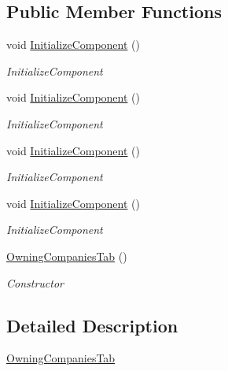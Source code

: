 \subsection*{Public Member Functions}
\begin{DoxyCompactItemize}
\item 
void \hyperlink{class_baudi_1_1_client_1_1_view_1_1_tabs_1_1_owning_companies_tab_a6af8326189b6a8d1e625456e1c353631}{Initialize\+Component} ()
\begin{DoxyCompactList}\small\item\em Initialize\+Component \end{DoxyCompactList}\item 
void \hyperlink{class_baudi_1_1_client_1_1_view_1_1_tabs_1_1_owning_companies_tab_a6af8326189b6a8d1e625456e1c353631}{Initialize\+Component} ()
\begin{DoxyCompactList}\small\item\em Initialize\+Component \end{DoxyCompactList}\item 
void \hyperlink{class_baudi_1_1_client_1_1_view_1_1_tabs_1_1_owning_companies_tab_a6af8326189b6a8d1e625456e1c353631}{Initialize\+Component} ()
\begin{DoxyCompactList}\small\item\em Initialize\+Component \end{DoxyCompactList}\item 
void \hyperlink{class_baudi_1_1_client_1_1_view_1_1_tabs_1_1_owning_companies_tab_a6af8326189b6a8d1e625456e1c353631}{Initialize\+Component} ()
\begin{DoxyCompactList}\small\item\em Initialize\+Component \end{DoxyCompactList}\item 
\hyperlink{class_baudi_1_1_client_1_1_view_1_1_tabs_1_1_owning_companies_tab_af3364319af72ee75b95ff3c95cc388fa}{Owning\+Companies\+Tab} ()
\begin{DoxyCompactList}\small\item\em Constructor \end{DoxyCompactList}\end{DoxyCompactItemize}


\subsection{Detailed Description}
\hyperlink{class_baudi_1_1_client_1_1_view_1_1_tabs_1_1_owning_companies_tab}{Owning\+Companies\+Tab} 

